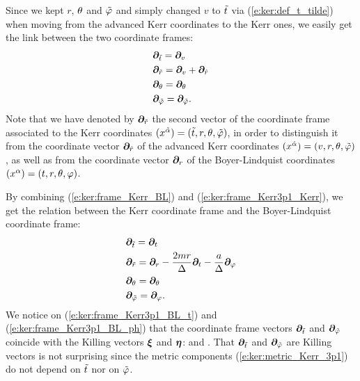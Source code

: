 Since we kept $r$, $\theta$ and ${\tilde\varphi}$ and simply changed
$v$ to ${\tilde t}$ via (\ref{e:ker:def_t_tilde}) when moving from the advanced Kerr
coordinates to the Kerr ones, we easily get the link
between the two coordinate frames:
\begin{subequations}
\label{e:ker:frame_Kerr3p1_Kerr}
\begin{align}
    & \bm{\partial}_{\tilde t} = \bm{\partial}_v \\
    & \bm{\partial}_{\tilde r} = \bm{\partial}_v + \bm{\partial}_{\hat{r}} \\
    & \bm{\partial}_\theta = \bm{\partial}_\theta \\
    & \bm{\partial}_{\tilde\varphi} = \bm{\partial}_{\tilde\varphi} .
\end{align}
\end{subequations}
Note that we have denoted by $\bm{\partial}_{\tilde r}$ the second vector of the
coordinate frame associated to the Kerr coordinates
$(x^{\tilde{\alpha}}) = ({\tilde t}, r, \theta,{\tilde\varphi})$, in order to distinguish it from
the coordinate vector $\bm{\partial}_{\hat r}$ of the advanced Kerr coordinates
$(x^{\hat{\alpha}}) = (v, r, \theta,{\tilde\varphi})$, as well as from the coordinate vector
$\bm{\partial}_r$ of the Boyer-Lindquist coordinates
$(x^\alpha) = (t,r,\theta,\varphi)$.

By combining (\ref{e:ker:frame_Kerr_BL}) and (\ref{e:ker:frame_Kerr3p1_Kerr}),
we get the relation between the Kerr coordinate frame and the
Boyer-Lindquist coordinate frame:
\begin{subequations}
\label{e:ker:frame_Kerr3p1_BL}
\begin{align}
    & \bm{\partial}_{\tilde t} = \bm{\partial}_t \label{e:ker:frame_Kerr3p1_BL_t} \\
    & \bm{\partial}_{\tilde r} = \bm{\partial}_r - \frac{2mr}{\Delta} \bm{\partial}_t
                        - \frac{a}{\Delta} \bm{\partial}_\varphi \\
    & \bm{\partial}_\theta = \bm{\partial}_\theta \\
    & \bm{\partial}_{{\tilde\varphi}} = \bm{\partial}_\varphi . \label{e:ker:frame_Kerr3p1_BL_ph}
\end{align}
\end{subequations}
We notice on (\ref{e:ker:frame_Kerr3p1_BL_t}) and (\ref{e:ker:frame_Kerr3p1_BL_ph})
that the coordinate frame vectors $\bm{\partial}_{\tilde t}$ and $\bm{\partial}_{\tilde\varphi}$
coincide with the Killing vectors $\bm{\xi}$ and $\bm{\eta}$:
\be \label{e:ker:Killing_vec_3p1}
    \encadre{\wpar_\ti = \w{\xi}} \quad \mbox{and} \quad
    \encadre{\wpar_\tph = \w{\eta}} .
\ee
That $\bm{\partial}_{\tilde t}$ and $\bm{\partial}_{\tilde\varphi}$ are Killing vectors is not surprising since
the metric components (\ref{e:ker:metric_Kerr_3p1}) do not depend on ${\tilde t}$
nor on ${\tilde\varphi}$.


